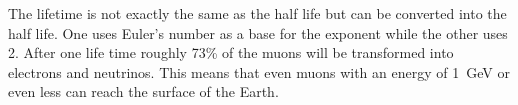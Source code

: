 \documentclass[12pt,a4paper]{article}
\numberwithin{equation}{section}
\numberwithin{figure}{section}
\numberwithin{table}{section}
\begin{document}
The lifetime is not exactly the same as the half life but can be converted into the half life. One uses Euler's number as a base for the exponent while the other uses 2. After one life time roughly 73\% of the muons will be transformed into electrons and neutrinos. This means that even muons with an energy of 1~GeV or even less can reach the surface of the Earth.
\end{document}
